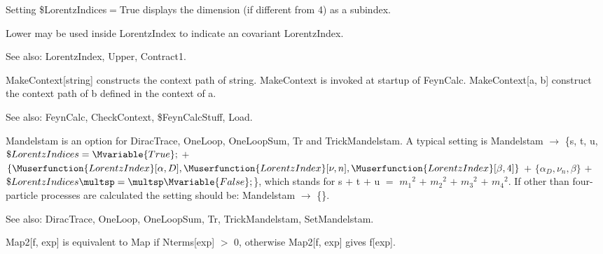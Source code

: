 \dispSFoutmath{
{{\alpha }^*}
}

Setting \${}LorentzIndices\(=\)True displays the dimension (if different from 4) as a subindex.


\dispSFinmath{
\mu
}


\dispSFinmath{
{{\beta }^*}
}



Lower may be used inside LorentzIndex to indicate an covariant LorentzIndex.

See also:  LorentzIndex, Upper, Contract1.



MakeContext[string] constructs the context path of string. MakeContext is invoked at startup of FeynCalc. MakeContext[a, b] construct the
  context path of b defined in the context of a.

See also:  FeynCalc, CheckContext, \${}FeynCalcStuff, Load.



Mandelstam is an option for DiracTrace, OneLoop, OneLoopSum, Tr and TrickMandelstam. { }A typical setting is Mandelstam \(\rightarrow \)
  \{s, t, u, \(\$LorentzIndices=\Mvariable{True};\) \(+\) \(\{\Muserfunction{LorentzIndex}[\alpha ,D],\Muserfunction{LorentzIndex}[\nu ,n],\Muserfunction{LorentzIndex}[\beta
,4]\}\) \(+\) \(\{{{\alpha }_D},{{\nu }_n},\beta \}\) \(+\) \(\$LorentzIndices\multsp =\multsp \Mvariable{False};\)\}, which stands for { }s \(+\)
t \(+\) u \(=\) \({{{m_1}}^2}\) \(+\) \({{{m_2}}^2}\) \(+\) \({{{m_3}}^2}\) \(+\) \({{{m_4}}^2}\). If other than four-particle processes are calculated
the setting should be: Mandelstam \(\rightarrow \) \{\}.

See also:  DiracTrace, OneLoop, OneLoopSum, Tr, TrickMandelstam, SetMandelstam.



Map2[f, exp] is equivalent to Map if Nterms[exp] \(>\) 0, otherwise Map2[f, exp] gives f[exp].

